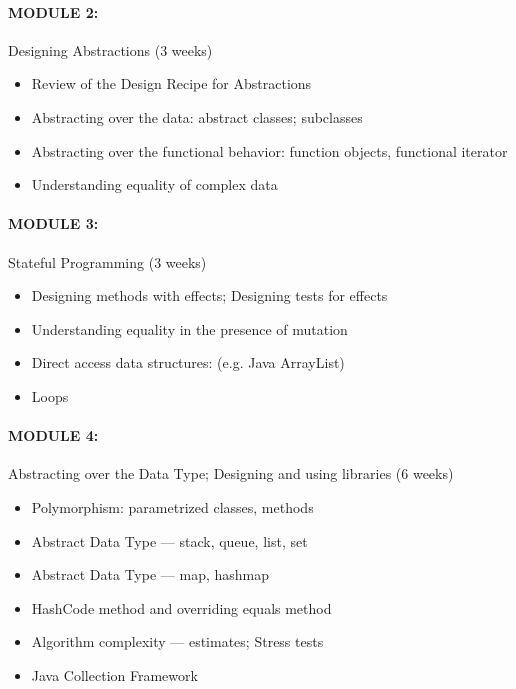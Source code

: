 \documentclass[11pt]{article}
\begin{document}
\paragraph{MODULE 2:}
%
Designing Abstractions (3 weeks)
%
\begin{itemize}
\item Review of the Design Recipe for Abstractions
\item Abstracting over the data: abstract classes; subclasses
\item Abstracting over the functional behavior: function objects, functional iterator
\item Understanding equality of complex data
\end{itemize}

\paragraph{MODULE 3:}
%
Stateful Programming (3 weeks)
%
\begin{itemize}
\item Designing methods with effects; Designing tests for effects
\item Understanding equality in the presence of mutation
\item Direct access data structures: (e.g. Java ArrayList)
\item Loops
\end{itemize}

\paragraph{MODULE 4:}
%
Abstracting over the Data Type; Designing and using libraries (6 weeks)
%
\begin{itemize}
\item Polymorphism: parametrized classes, methods
\item Abstract Data Type --- stack, queue, list, set
\item Abstract Data Type --- map, hashmap
\item HashCode method and overriding equals method
\item Algorithm complexity --- estimates; Stress tests
\item Java Collection Framework
\end{itemize}
\end{document}
